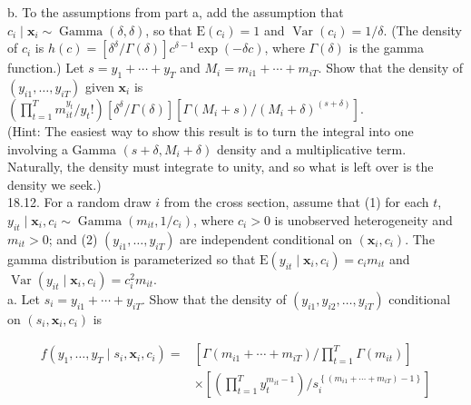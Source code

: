 \documentclass[10pt]{article}
\begin{document}
b. To the assumptions from part a, add the assumption that $c_{i} \mid \mathbf{x}_{i} \sim \operatorname{Gamma}(\delta, \delta)$, so that $\mathrm{E}\left(c_{i}\right)=1$ and $\operatorname{Var}\left(c_{i}\right)=1 / \delta$. (The density of $c_{i}$ is $h(c)=\left[\delta^{\delta} / \Gamma(\delta)\right] c^{\delta-1} \exp (-\delta c)$, where $\Gamma(\delta)$ is the gamma function.) Let $s=y_{1}+\cdots+y_{T}$ and $M_{i}=m_{i 1}+\cdots+m_{i T}$. Show that the density of $\left(y_{i 1}, \ldots, y_{i T}\right)$ given $\mathbf{x}_{i}$ is\\
$\left(\prod_{t=1}^{T} m_{i t}^{y_{t}} / y_{t}!\right)\left[\delta^{\delta} / \Gamma(\delta)\right]\left[\Gamma\left(M_{i}+s\right) /\left(M_{i}+\delta\right)^{(s+\delta)}\right]$.\\
(Hint: The easiest way to show this result is to turn the integral into one involving a Gamma $\left(s+\delta, M_{i}+\delta\right)$ density and a multiplicative term. Naturally, the density must integrate to unity, and so what is left over is the density we seek.)\\
18.12. For a random draw $i$ from the cross section, assume that (1) for each $t$, $y_{i t} \mid \mathbf{x}_{i}, c_{i} \sim \operatorname{Gamma}\left(m_{i t}, 1 / c_{i}\right)$, where $c_{i}>0$ is unobserved heterogeneity and $m_{i t}>0$; and (2) $\left(y_{i 1}, \ldots, y_{i T}\right)$ are independent conditional on $\left(\mathbf{x}_{i}, c_{i}\right)$. The gamma distribution is parameterized so that $\mathrm{E}\left(y_{i t} \mid \mathbf{x}_{i}, c_{i}\right)=c_{i} m_{i t}$ and $\operatorname{Var}\left(y_{i t} \mid \mathbf{x}_{i}, c_{i}\right)=c_{i}^{2} m_{i t}$.\\
a. Let $s_{i}=y_{i 1}+\cdots+y_{i T}$. Show that the density of $\left(y_{i 1}, y_{i 2}, \ldots, y_{i T}\right)$ conditional on $\left(s_{i}, \mathbf{x}_{i}, c_{i}\right)$ is

$$
\begin{aligned}
f\left(y_{1}, \ldots, y_{T} \mid s_{i}, \mathbf{x}_{i}, c_{i}\right)= & {\left[\Gamma\left(m_{i 1}+\cdots+m_{i T}\right) / \prod_{t=1}^{T} \Gamma\left(m_{i t}\right)\right] } \\
& \times\left[\left(\prod_{t=1}^{T} y_{t}^{m_{i t}-1}\right) / s_{i}^{\left\{\left(m_{i 1}+\cdots+m_{i T}\right)-1\right\}}\right]
\end{aligned}
$$
\end{document}
